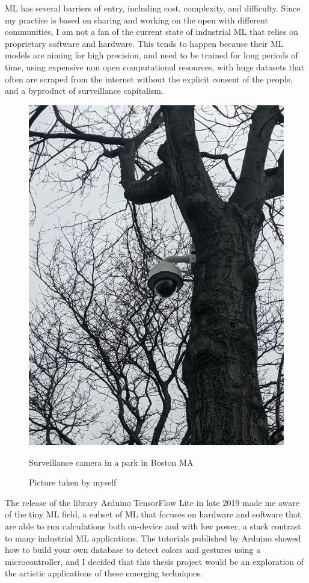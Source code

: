 \acrshort{ML} has several barriers of entry, including cost, complexity, and difficulty. Since my practice is based on sharing and working on the open with different communities, I am not a fan of the current state of industrial \acrshort{ML} that relies on proprietary software and hardware. This tends to happen because their ML models are aiming for high precision, and need to be trained for long periods of time, using expensive non open computational resources, with huge datasets that often are scraped from the internet without the explicit consent of the people, and a byproduct of surveillance capitalism.

\begin{figure}[ht]
  \centering
  \includegraphics[width=0.75\linewidth,height=0.25\textheight,keepaspectratio]{images/surveillance-camera-tree.jpg}
  \caption{Surveillance camera in a park in Boston MA}
  \caption*{Picture taken by myself}
  \label{fig:surveillance-camera-tree}
\end{figure}

The release of the library Arduino TensorFlow Lite in late 2019 made me aware of the tiny \acrshort{ML} field, a subset of \acrshort{ML} that focuses on hardware and software that are able to run calculations both on-device and with low power, a stark contrast to many industrial \acrshort{ML} applications. The tutorials published by Arduino showed how to build your own database to detect colors and gestures using a microcontroller, and I decided that this thesis project would be an exploration of the artistic applications of these emerging techniques.

